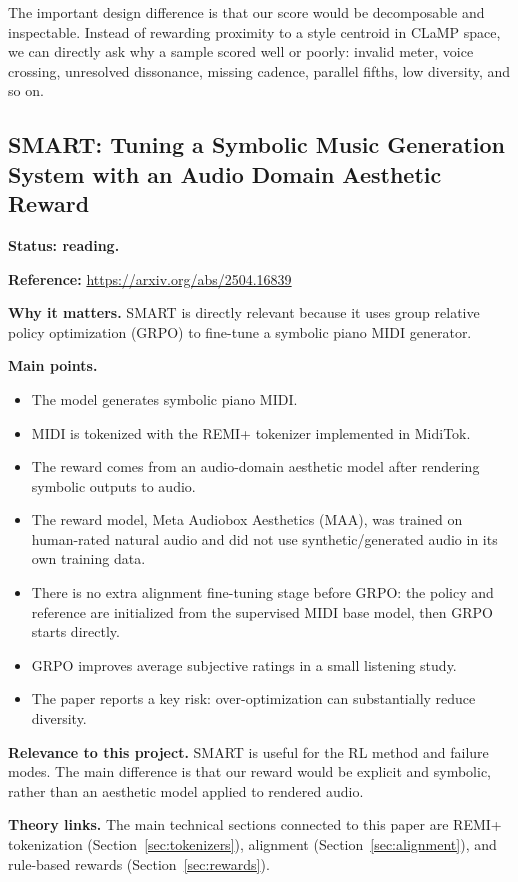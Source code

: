 \documentclass[11pt]{article}
\begin{document}
The important design difference is that our score would be decomposable and
inspectable. Instead of rewarding proximity to a style centroid in CLaMP space,
we can directly ask why a sample scored well or poorly: invalid meter, voice
crossing, unresolved dissonance, missing cadence, parallel fifths, low diversity,
and so on.

\subsection{SMART: Tuning a Symbolic Music Generation System with an Audio Domain Aesthetic Reward}
\label{sec:paper-smart}

\textbf{Status: reading.}

\textbf{Reference:}
\url{https://arxiv.org/abs/2504.16839}

\textbf{Why it matters.}
SMART is directly relevant because it uses group relative policy optimization
(GRPO) to fine-tune a symbolic piano MIDI generator.

\textbf{Main points.}
\begin{itemize}[leftmargin=*]
  \item The model generates symbolic piano MIDI.
  \item MIDI is tokenized with the REMI+ tokenizer implemented in MidiTok.
  \item The reward comes from an audio-domain aesthetic model after rendering
  symbolic outputs to audio.
  \item The reward model, Meta Audiobox Aesthetics (MAA), was trained on
  human-rated natural audio and did not use synthetic/generated audio in its own
  training data.
  \item There is no extra alignment fine-tuning stage before GRPO: the policy and
  reference are initialized from the supervised MIDI base model, then GRPO starts
  directly.
  \item GRPO improves average subjective ratings in a small listening study.
  \item The paper reports a key risk: over-optimization can substantially reduce
  diversity.
\end{itemize}

\textbf{Relevance to this project.}
SMART is useful for the RL method and failure modes. The main difference is that
our reward would be explicit and symbolic, rather than an aesthetic model applied
to rendered audio.

\textbf{Theory links.}
The main technical sections connected to this paper are REMI+ tokenization
(Section~\ref{sec:tokenizers}), alignment (Section~\ref{sec:alignment}), and
rule-based rewards (Section~\ref{sec:rewards}).
\end{document}
